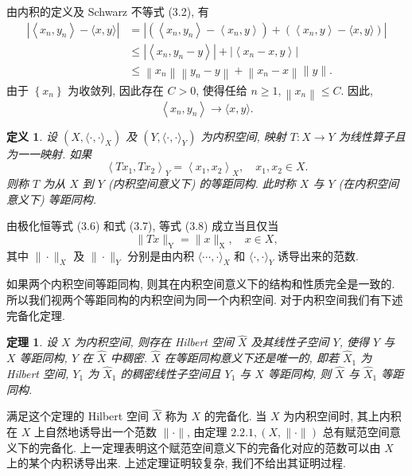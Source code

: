 \documentclass[openany]{ctexbook}
\makeatletter
\theoremstyle{kaiti}
\newtheorem{definition}{定义}[section]
\newtheorem{theorem}{定理}[section]
\theoremstyle{normal}
\renewenvironment{proof}[1][\proofname]{\par
    \pushQED{\qed}%
    \normalfont \topsep6\p@\@plus6\p@\relax
    \trivlist
    \item\relax
    {\heiti #1}\hspace{2\labelsep}\ignorespaces
  }{%
    \popQED\endtrivlist\@endpefalse
  }
\makeatother
\begin{document}
\begin{proof}
由内积的定义及 Schwarz 不等式 (3.2), 有
$$
\begin{aligned}
\left|\left\langle x_n, y_n\right\rangle-\langle x, y\rangle\right| &=\left|\left(\left\langle x_n, y_n\right\rangle-\left\langle x_n, y\right\rangle\right)+\left(\left\langle x_n, y\right\rangle-\langle x, y\rangle\right)\right| \\
& \leqslant\left|\left\langle x_n, y_n-y\right\rangle\right|+\left|\left\langle x_n-x, y\right\rangle\right| \\
& \leqslant\left\|x_n\right\|\left\|y_n-y\right\|+\left\|x_n-x\right\|\|y\|.
\end{aligned}
$$
由于 $\left\{x_n\right\}$ 为收敛列, 因此存在 $C>0$, 使得任给 $n \geqslant 1,\left\|x_n\right\| \leqslant C$. 因此,
$$
\left\langle x_n, y_n\right\rangle \rightarrow\langle x, y\rangle.
$$
\end{proof}

\begin{definition}
设 $\left(X,\langle\cdot, \cdot\rangle_{X}\right)$ 及 $\left(Y,\langle\cdot, \cdot\rangle_{Y}\right)$ 为内积空间, 映射 $T: X \rightarrow Y$ 为线性算子且为一一映射. 如果
\begin{equation}
  \left\langle T x_1, T x_2\right\rangle_{Y}=\left\langle x_1, x_2\right\rangle_{X}, \quad x_1, x_2 \in X.
\end{equation}
则称 $T$ 为从 $X$ 到 $Y$ (内积空间意义下) 的等距同构. 此时称 $X$ 与 $Y$ (在内积空间意义下) 等距同构.
\end{definition}

由极化恒等式 (3.6) 和式 (3.7), 等式 (3.8) 成立当且仅当
$$
\|T x\|_{\mathrm{Y}}=\|x\|_{\mathrm{X}}, \quad x \in X,
$$
其中 $\|\cdot\|_{X}$ 及 $\|\cdot\|_{Y}$ 分别是由内积 $\langle\cdots, \cdot\rangle_{X}$ 和 $\langle\cdot, \cdot\rangle_{Y}$ 诱导出来的范数.

如果两个内积空间等距同构, 则其在内积空间意义下的结构和性质完全是一致的. 所以我们视两个等距同构的内积空间为同一个内积空间. 对于内积空间我们有下述完备化定理.

\begin{theorem}
  设 $X$ 为内积空间, 则存在 Hilbert 空间 $\hat{X}$ 及其线性子空间 $Y$, 使得 $Y$ 与 $X$ 等距同构, $Y$ 在 $\hat{X}$ 中稠密. $\hat{X}$ 在等距同构意义下还是唯一的, 即若 $\hat{X}_1$ 为 Hilbert 空间, $Y_1$ 为 $\hat{X}_1$ 的稠密线性子空间且 $Y_1$ 与 $X$ 等距同构, 则 $\hat{X}$ 与 $\hat{X}_1$ 等距同构.
\end{theorem}

满足这个定理的 Hilbert 空间 $\hat{X}$ 称为 $X$ 的完备化. 当 $X$ 为内积空间时, 其上内积在 $X$ 上自然地诱导出一个范数 $\|\cdot\|$, 由定理 $2.2.1,(X,\|\cdot\|)$ 总有赋范空间意义下的完备化. 上一定理表明这个赋范空间意义下的完备化对应的范数可以由 $X$ 上的某个内积诱导出来. 上述定理证明较复杂, 我们不给出其证明过程.
\end{document}
